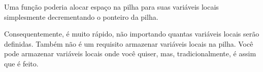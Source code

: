 
Uma função poderia alocar espaço na pilha para suas variáveis locais simplesmente decrementando o ponteiro da pilha.


Consequentemente, é muito rápido, não importando quantas variáveis locais serão definidas.
Também não é um requisito armazenar variáveis locais na pilha.
Você pode armazenar variáveis locais onde você quiser, mas, tradicionalmente, é assim que é feito.

